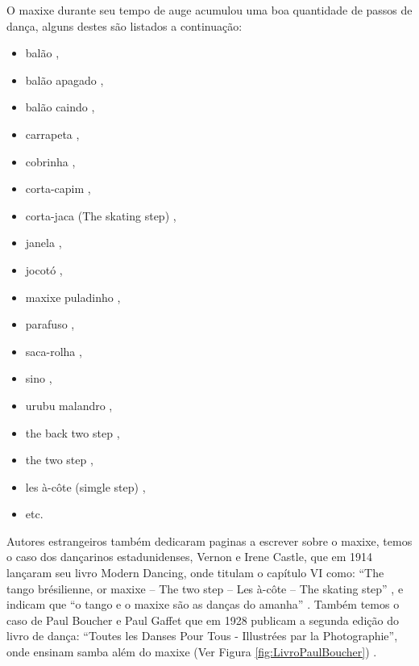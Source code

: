 O maxixe durante seu tempo de auge acumulou uma boa quantidade de passos de dança, 
alguns destes são listados a continuação: 
\begin{itemize} 
\item balão \cite[pp. 93]{efege1974maxixe} \cite[pp. 465]{marcondes1977enciclopedia}, 
\item balão apagado \cite[pp. 68]{efege1974maxixe} \cite[aproximadamente min. 11:35]{MaxixeDocumentario1},
\item balão caindo  \cite[pp. 129, 131]{efege1974maxixe} \cite[pp. 62]{tinhorao1986pequena},
\item carrapeta  \cite[pp. 465]{marcondes1977enciclopedia}, 
\item cobrinha \cite[pp. 62]{tinhorao1986pequena},
\item corta-capim \cite[pp. 465]{marcondes1977enciclopedia} \cite[pp. 62]{tinhorao1986pequena}, 
\item corta-jaca (The skating step) \cite[pp. 131]{efege1974maxixe} \cite[pp. 112]{castle1914modern},
\item janela  \cite[pp. 129]{efege1974maxixe},
\item jocotó \cite[pp. 83, 96, 173]{efege1974maxixe},
\item maxixe puladinho \cite[pp. 177]{1920revista},
\item parafuso  \cite[pp. 68, 93, 129]{efege1974maxixe} \cite[pp. 465]{marcondes1977enciclopedia} \cite[pp. 62]{tinhorao1986pequena}, 
\item saca-rolha \cite[pp. 465]{marcondes1977enciclopedia}, 
\item sino \cite[pp. 68]{efege1974maxixe}, 
\item urubu malandro \cite[pp. 131]{efege1974maxixe},

\item the back two step \cite[pp. 119]{castle1914modern},
\item the two step \cite[pp. 108]{castle1914modern},
\item les à-côte (simgle step) \cite[pp. 112]{castle1914modern},
\item etc. 
\end{itemize}

Autores estrangeiros também dedicaram paginas a escrever sobre o maxixe,
temos o caso dos dançarinos estadunidenses, Vernon e Irene Castle, 
que em 1914 lançaram seu livro Modern Dancing,
onde titulam o capítulo VI como: ``The tango brésilienne, 
or maxixe -- The two step -- Les à-côte -- The skating step'' \cite[pp. 107]{castle1914modern},
e indicam que ``o tango e o maxixe são as danças do amanha'' \cite[pp. 85]{castle1914modern}.
Também temos o caso de Paul Boucher e Paul Gaffet que em 1928
publicam a segunda edição do livro de dança: 
``Toutes les Danses Pour Tous - Illustrées par la Photographie'',
onde ensinam samba além do maxixe (Ver Figura \ref{fig:LivroPaulBoucher}) \cite[pp. 14779]{library1929catalog}. 

